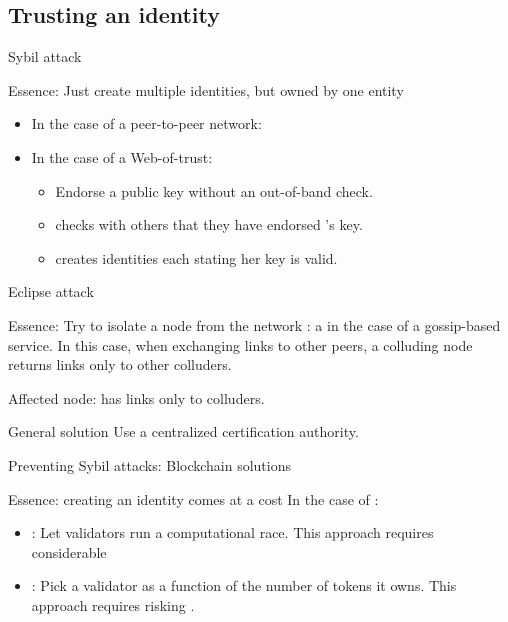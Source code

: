 \subsection{Trusting an identity}
\begin{slide}{Sybil attack}
  \begin{block}{Essence: Just create multiple identities, but owned by one entity}
    \begin{itemize}
    \item In the case of a peer-to-peer network:
      \begin{centerfig}
      \end{centerfig}
    \item<2-> In the case of a Web-of-trust:
      \begin{itemize}
      \item Endorse a public key without an out-of-band check.
      \item {} checks with  others that they have endorsed 's key.
      \item {} creates  identities each stating her key is valid.
      \end{itemize}
    \end{itemize}
  \end{block}
\end{slide}
\begin{slide}{Eclipse attack}
  \begin{block}{Essence: Try to isolate a node from the network}
    : a  in the case of a gossip-based service. In this case, when exchanging
    links to other peers, a colluding node returns links only to other colluders. 
    \begin{centerfig}
    \end{centerfig}
    Affected node: has links only to colluders.
  \end{block}
  \begin{block}{General solution}
    Use a centralized certification authority.
  \end{block}
\end{slide}
\begin{slide}{Preventing Sybil attacks: Blockchain solutions}
  \begin{block}{Essence: creating an identity comes at a cost}
    In the case of :
    \begin{itemize}
    \item {}: Let validators run a computational race. This approach requires considerable
    \item {}: Pick a validator as a function of the number of tokens it owns. This approach
      requires risking .
    \end{itemize}
  \end{block}
\end{slide}

